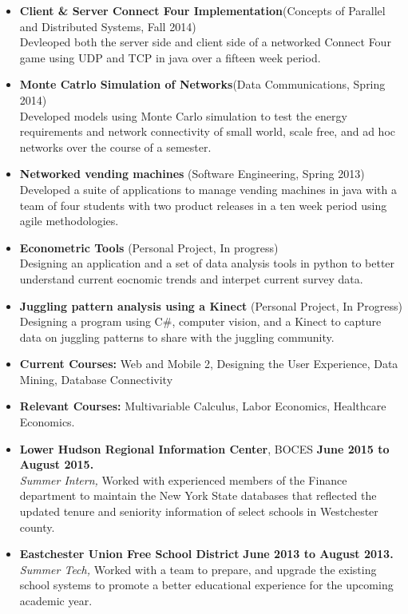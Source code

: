 \documentclass[10pt]{article}
\begin{document}
\begin{itemize}[topsep=.5ex, itemsep=0ex, partopsep=0ex, parsep=1ex]
    \item[] {\bf Client \& Server Connect Four Implementation}(Concepts of Parallel and Distributed Systems, Fall 2014)\\
    Devleoped both the server side and client side of a networked Connect Four game using UDP and TCP in java over a fifteen week period.
	\item[] {\bf Monte Catrlo Simulation of Networks}(Data Communications, Spring 2014)\\
	Developed models using Monte Carlo simulation to test the energy requirements and network connectivity of small world, scale free, and ad hoc networks over the course of a semester.
	\item[] {\bf Networked vending machines} (Software Engineering, Spring 2013)\\
	Developed a suite of applications to manage vending machines in java with a team of four students with two product releases in a ten week period using agile methodologies.
	\item[] {\bf Econometric Tools} (Personal Project, In progress)\\
	Designing  an application and a set of data analysis tools in python to better understand current eocnomic trends and interpet current survey data.
	\item[] {\bf Juggling pattern analysis using a Kinect} (Personal Project, In Progress)\\
    Designing a program using C\#, computer vision, and a Kinect to capture data on juggling patterns to share with the juggling community.
	\item[] {\bf Current Courses:} Web and Mobile 2, Designing the User Experience, Data Mining, Database Connectivity
	\item[] {\bf Relevant Courses:} Multivariable Calculus, Labor Economics, Healthcare Economics.
\end{itemize}
\vspace{1ex}
\begin{itemize} [topsep=.5ex, itemsep=0ex, partopsep=0ex, parsep=1ex]
	\item[]{{\bf Lower Hudson Regional Information Center}, BOCES \hfill {\bf June 2015 to August 2015.}}\\
	{\it Summer Intern,}
	Worked with experienced members of the Finance department to maintain the New York
	State databases that reflected the updated tenure and seniority information of select schools in Westchester county.
	\item[]{{\bf Eastchester Union Free School District} \hfill { \bf June 2013 to August 2013.}}\\
		{\it Summer Tech,}
		{Worked with a team to prepare, and upgrade the existing school systems to promote a better educational experience for the upcoming academic year.}
\end{itemize}
\end{document}
